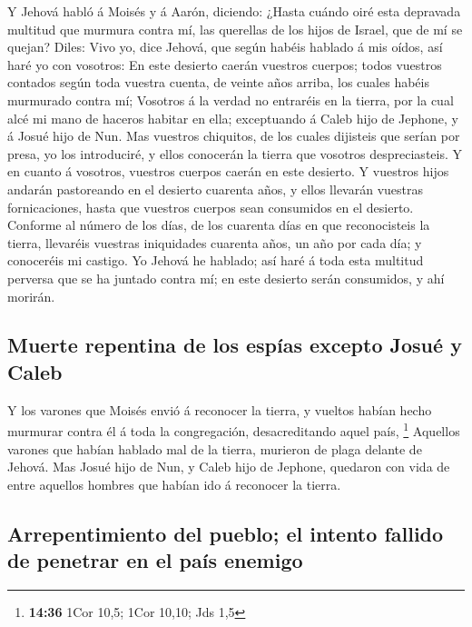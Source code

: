  Y Jehová habló á Moisés y á Aarón, diciendo: 
¿Hasta cuándo oiré esta depravada multitud que murmura contra mí, las
querellas de los hijos de Israel, que de mí se quejan? 
Diles: Vivo yo, dice Jehová, que según habéis hablado á mis oídos, así
haré yo con vosotros:  En este desierto caerán vuestros
cuerpos; todos vuestros contados según toda vuestra cuenta, de veinte
años arriba, los cuales habéis murmurado contra mí; 
Vosotros á la verdad no entraréis en la tierra, por la cual alcé mi mano
de haceros habitar en ella; exceptuando á Caleb hijo de Jephone, y á
Josué hijo de Nun.  Mas vuestros chiquitos, de los cuales
dijisteis que serían por presa, yo los introduciré, y ellos conocerán la
tierra que vosotros despreciasteis.  Y en cuanto á
vosotros, vuestros cuerpos caerán en este desierto.  Y
vuestros hijos andarán pastoreando en el desierto cuarenta años, y ellos
llevarán vuestras fornicaciones, hasta que vuestros cuerpos sean
consumidos en el desierto.  Conforme al número de los días,
de los cuarenta días en que reconocisteis la tierra, llevaréis vuestras
iniquidades cuarenta años, un año por cada día; y conoceréis mi castigo.
 Yo Jehová he hablado; así haré á toda esta multitud
perversa que se ha juntado contra mí; en este desierto serán consumidos,
y ahí morirán.

\hypertarget{muerte-repentina-de-los-espuxedas-excepto-josuuxe9-y-caleb}{%
\subsection{Muerte repentina de los espías excepto Josué y
Caleb}\label{muerte-repentina-de-los-espuxedas-excepto-josuuxe9-y-caleb}}

 Y los varones que Moisés envió á reconocer la tierra, y
vueltos habían hecho murmurar contra él á toda la congregación,
desacreditando aquel país, \footnote{\textbf{14:36} 1Cor 10,5; 1Cor
  10,10; Jds 1,5}  Aquellos varones que habían hablado mal
de la tierra, murieron de plaga delante de Jehová.  Mas
Josué hijo de Nun, y Caleb hijo de Jephone, quedaron con vida de entre
aquellos hombres que habían ido á reconocer la tierra.

\hypertarget{arrepentimiento-del-pueblo-el-intento-fallido-de-penetrar-en-el-pauxeds-enemigo}{%
\subsection{Arrepentimiento del pueblo; el intento fallido de penetrar
en el país
enemigo}\label{arrepentimiento-del-pueblo-el-intento-fallido-de-penetrar-en-el-pauxeds-enemigo}}

